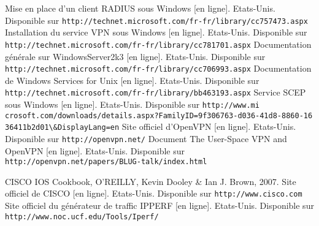 \renewcommand{\bibname}{Bibliographie}
\renewcommand{\refname}{Bibliographie}

\begin{thebibliography}{Bibliographie}

	 Mise en place d'un client RADIUS sous Windows [en ligne]. Etats-Unis. Disponible sur \verb|http://technet.microsoft.com/fr-fr/library/cc757473.aspx|
	 Installation du service VPN sous Windows [en ligne]. Etats-Unis. Disponible sur \verb|http://technet.microsoft.com/fr-fr/library/cc781701.aspx|
	 Documentation générale sur WindowsServer2k3 [en ligne]. Etats-Unis. Disponible sur \verb|http://technet.microsoft.com/fr-fr/library/cc706993.aspx|
	 Documentation de Windows Services for Unix [en ligne]. Etats-Unis. Disponible sur \verb|http://technet.microsoft.com/fr-fr/library/bb463193.aspx|
	 Service SCEP sous Windows [en ligne]. Etats-Unis. Disponible sur \verb|http://www.mi| \verb|crosoft.com/downloads/details.aspx?FamilyID=9f306763-d036-41d8-8860-16| \verb|36411b2d01\&DisplayLang=en|
	 Site officiel d'OpenVPN [en ligne]. Etats-Unis. Disponible sur \verb|http://openvpn.net/|
	 Document The User-Space VPN and OpenVPN [en ligne]. Etats-Unis. Disponible sur \verb|http://openvpn.net/papers/BLUG-talk/index.html|

	 CISCO IOS Cookbook, O'REILLY, Kevin Dooley \& Ian J. Brown, 2007.
	 Site officiel de CISCO [en ligne]. Etats-Unis. Disponible sur \verb|http://www.cisco.com|
	 Site officiel du générateur de traffic IPPERF [en ligne]. Etats-Unis. Disponible sur \verb|http://www.noc.ucf.edu/Tools/Iperf/|
\end{thebibliography}

\pagebreak
